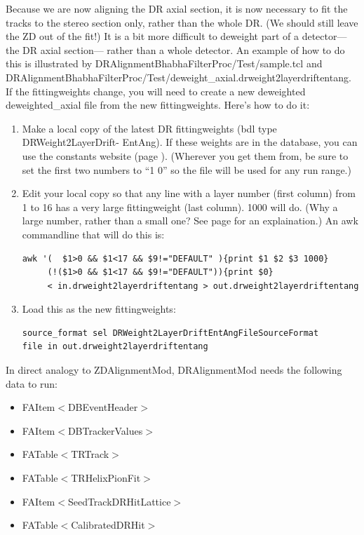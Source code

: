 \documentclass[12pt]{article}
\begin{document}
Because we are now aligning the DR axial section, it is now necessary
to fit the tracks to the stereo section only, rather than the whole
DR.  (We should still leave the ZD out of the fit!)  It is a bit more
difficult to deweight part of a detector--- the DR axial section---
rather than a whole detector.  An example of how to do this is
illustrated by DRAlignmentBhabhaFilterProc/Test/sample.tcl and
DRAlignmentBhabhaFilterProc/Test/deweight\_axial.drweight2layerdriftentang.
If the fittingweights change, you will need to create a new deweighted
deweighted\_axial file from the new fittingweights. Here's how to do
it:
\begin{enumerate}

  \item Make a local copy of the latest DR fittingweights (bdl type
  DRWeight2LayerDrift- EntAng).  If these weights are in the database,
  you can use the constants website (page \pageref{constantsweb}).
  (Wherever you get them from, be sure to set the first two numbers to
  ``1 0'' so the file will be used for any run range.)

  \item Edit your local copy so that any line with a layer number
  (first column) from 1 to 16 has a very large fittingweight (last
  column).  1000 will do.  (Why a large number, rather than a small
  one?  See page \pageref{fittingweights} for an explaination.)  An
  awk commandline that will do this is:
  \begin{verbatim}
awk '(  $1>0 && $1<17 && $9!="DEFAULT" ){print $1 $2 $3 1000}
     (!($1>0 && $1<17 && $9!="DEFAULT")){print $0}
     < in.drweight2layerdriftentang > out.drweight2layerdriftentang \end{verbatim}

  \item Load this as the new fittingweights:
\begin{verbatim}
source_format sel DRWeight2LayerDriftEntAngFileSourceFormat
file in out.drweight2layerdriftentang \end{verbatim}

\end{enumerate}

In direct analogy to ZDAlignmentMod, DRAlignmentMod needs the
following data to run:
\begin{itemize} \renewcommand{\labelitemi}{$-$}
  \item FAItem$<$DBEventHeader$>$
  \item FAItem$<$DBTrackerValues$>$
  \item FATable$<$TRTrack$>$
  \item FATable$<$TRHelixPionFit$>$
  \item FAItem$<$SeedTrackDRHitLattice$>$
  \item FATable$<$CalibratedDRHit$>$
\end{itemize}
\end{document}

